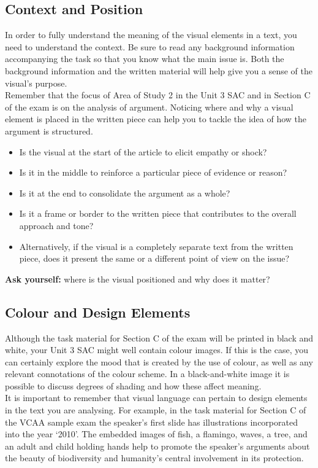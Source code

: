 \documentclass[a4paper]{article}
\begin{document}
\subsection{Context and Position}
In order to fully understand the meaning of the visual elements in a text, you need to understand the context. Be sure to read any background information accompanying the task so that you know what the main issue is. Both the background information and the written material will help give you a sense of the visual’s purpose.\\

Remember that the focus of Area of Study 2 in the Unit 3 SAC and in Section C of the exam is on the analysis of argument. Noticing where and why a visual element is placed in the written piece can help you to tackle the idea of how the argument is structured.\\

\begin{itemize}
\item Is the visual at the start of the article to elicit empathy or shock?
\item Is it in the middle to reinforce a particular piece of evidence or reason?
\item Is it at the end to consolidate the argument as a whole?
\item Is it a frame or border to the written piece that contributes to the overall approach and tone?
\item Alternatively, if the visual is a completely separate text from the written piece, does it present the same or a different point of view on the issue?
\end{itemize}

\textbf{Ask yourself:} where is the visual positioned and why does it matter?

\subsection{Colour and Design Elements}
Although the task material for Section C of the exam will be printed in black and white, your Unit 3 SAC might well contain colour images. If this is the case, you can certainly explore the mood that is created by the use of colour, as well as any relevant connotations of the colour scheme. In a black-and-white image it is possible to discuss degrees of shading and how these affect meaning.\\

It is important to remember that visual language can pertain to design elements in the text you are analysing. For example, in the task material for Section C of the VCAA sample exam the speaker’s first slide has illustrations incorporated into the year ‘2010’. The embedded images of fish, a flamingo, waves, a tree, and an adult and child holding hands help to promote the speaker’s arguments about the beauty of biodiversity and humanity’s central involvement in its protection.\\
\end{document}
